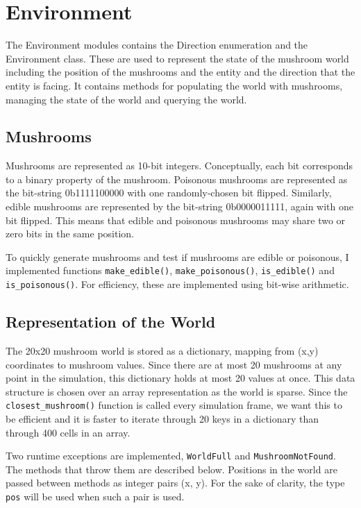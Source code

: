 \documentclass[12pt,a4paper,twoside,openright]{report}
\begin{document}
\section{Environment}

The Environment modules contains the Direction enumeration and the Environment class. These are used to represent the state of the mushroom world including the position of the mushrooms and the entity and the direction that the entity is facing. It contains methods for populating the world with mushrooms, managing the state of the world and querying the world.

\subsection{Mushrooms}\label{section:mushrooms}

Mushrooms are represented as 10-bit integers. Conceptually, each bit corresponds to a binary property of the mushroom. Poisonous mushrooms are represented as the bit-string 0b1111100000 with one randomly-chosen bit flipped. Similarly, edible mushrooms are represented by the bit-string 0b0000011111, again with one bit flipped. This means that edible and poisonous mushrooms may share two or zero bits in the same position.

To quickly generate mushrooms and test if mushrooms are edible or poisonous, I implemented functions \texttt{make\_edible()}, \texttt{make\_poisonous()}, \texttt{is\_edible()} and \texttt{is\_poisonous()}. For efficiency, these are implemented using bit-wise arithmetic.

\subsection{Representation of the World}

The 20x20 mushroom world is stored as a dictionary, mapping from (x,y) coordinates to mushroom values. Since there are at most 20 mushrooms at any point in the simulation, this dictionary holds at most 20 values at once. This data structure is chosen over an array representation as the world is sparse. Since the \texttt{closest\_mushroom()} function is called every simulation frame, we want this to be efficient and it is faster to iterate through 20 keys in a dictionary than through 400 cells in an array. 

Two runtime exceptions are implemented, \texttt{WorldFull} and \texttt{MushroomNotFound}. The methods that throw them are described below. Positions in the world are passed between methods as integer pairs (x, y). For the sake of clarity, the type \texttt{pos} will be used when such a pair is used.
\end{document}
